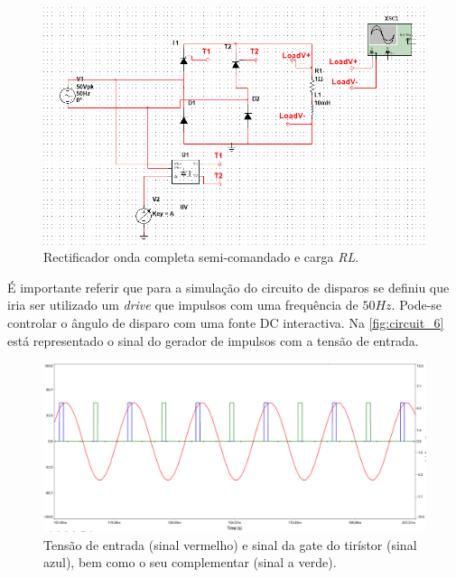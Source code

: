 \documentclass[a4paper,11pt]{article}
\numberwithin{equation}{section}
\begin{document}
\begin{figure}[h]
	\centering
	\includegraphics[keepaspectratio=true, scale=0.5]{img/circuito3}
	\caption{Rectificador onda completa semi-comandado e carga \textit{RL}.}
	\label{fig:circuit_5}
	\vspace{-0.8em}
\end{figure}
\pagebreak 

É importante referir que para a simulação do circuito de disparos se definiu que iria ser utilizado um \textit{drive} que impulsos com uma frequência  de $50Hz$. Pode-se controlar o ângulo de  disparo com uma fonte DC interactiva. Na \autoref{fig:circuit_6} está representado o sinal do gerador de impulsos com a tensão de entrada.
\vspace{17mm}

\begin{figure}[h]
	\centering
	\includegraphics[keepaspectratio=true, scale=0.4]{img/circuito4}
	\caption{Tensão de entrada (sinal vermelho) e sinal da gate do tirístor (sinal azul), bem como o seu complementar (sinal a verde).}
	\label{fig:circuit_6}
	\vspace{-0.8em}
\end{figure}
\end{document}
